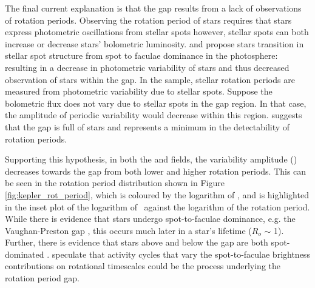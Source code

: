 The final current explanation is that the gap results from a lack of observations of rotation periods.
Observing the rotation period of \kepler{} stars requires that stars express photometric oscillations from stellar spots however, stellar spots can both increase or decrease stars' bolometric luminosity.
 \citet{reinhold_fast_2013} and \citet{reinhold_transition_2019} propose stars transition in stellar spot structure from spot to faculae dominance in the photosphere: resulting in a decrease in photometric variability of stars and thus decreased observation of stars within the gap.
In the \citet{mcquillan_rotation_2014} sample, stellar rotation periods are measured from photometric variability due to stellar spots.
Suppose the bolometric flux does not vary due to stellar spots in the gap region. 
In that case, the amplitude of periodic variability would decrease within this region.
\citet{reinhold_transition_2019} suggests that the gap is full of stars and represents a minimum in the detectability of rotation periods.

Supporting this hypothesis, in both the \kepler{} and \ktoo{} fields, the variability amplitude (\rper) decreases towards the gap from both lower and higher rotation periods.
This can be seen in the \citet{mcquillan_rotation_2014} rotation period distribution shown in Figure \ref{fig:kepler_rot_period}, which is coloured by the logarithm of \rper, and is highlighted in the inset plot of the logarithm of \rper \ against the logarithm of the rotation period.
While there is evidence that stars undergo spot-to-faculae dominance, e.g. the Vaughan-Preston gap \citep{vaughan_survey_1980}, this occurs much later in a star's lifetime ($R_o$ $\sim$ 1).
Further, there is evidence that stars above and below the gap are both spot-dominated  \citep{lockwood_patterns_2007, reinhold_transition_2019}.
\citet{reinhold_transition_2019} speculate that activity cycles that vary the spot-to-faculae brightness contributions on rotational timescales could be the process underlying the rotation period gap.


